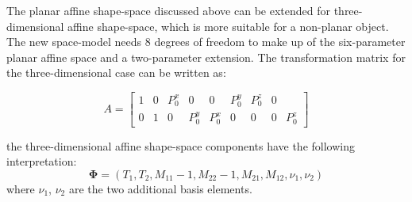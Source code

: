 The planar affine shape-space discussed above can be extended for
three-dimensional affine shape-space, which is more suitable for a
non-planar object. The new space-model needs 8 degrees of  freedom to
make up of the six-parameter planar affine space and a two-parameter
extension. The transformation matrix for the three-dimensional case
can be written as:

\begin{equation}
  \label{eq:4.20}
  A =
  \begin{bmatrix}
    1 & 0 & P_0^x & 0 & 0 & P_0^y & P_0^z & 0\\
    0 & 1 & 0 & P_0^y & P_0^x & 0 & 0 & 0 & P_0^z
  \end{bmatrix}  
\end{equation}

the three-dimensional affine shape-space components have
the following interpretation:
\begin{equation}
  \label{eq:4.19}
  \mathbf{\Phi} =  (T_1, T_2, M_{11} - 1, M_{22} - 1, M_{21}, M_{12},
  \nu_1, \nu_2)
\end{equation}
where $\nu_1$, $\nu_2$ are the two additional basis elements.








